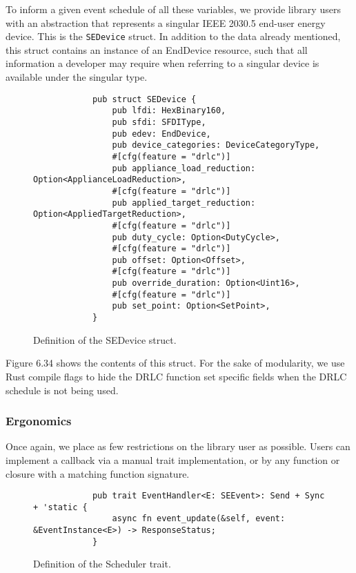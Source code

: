 To inform a given event schedule of all these variables, we provide library users with an abstraction that represents a singular IEEE 2030.5 end-user energy device. This is the \texttt{SEDevice} struct.
In addition to the data already mentioned, this struct contains an instance of an EndDevice resource, such that all information a developer may require when referring to a singular device is available under the singular type.

\begin{figure}[h]
    \begin{center}
        \begin{lstlisting}
            pub struct SEDevice {
                pub lfdi: HexBinary160,
                pub sfdi: SFDIType,
                pub edev: EndDevice,
                pub device_categories: DeviceCategoryType,
                #[cfg(feature = "drlc")]
                pub appliance_load_reduction: Option<ApplianceLoadReduction>,
                #[cfg(feature = "drlc")]
                pub applied_target_reduction: Option<AppliedTargetReduction>,
                #[cfg(feature = "drlc")]
                pub duty_cycle: Option<DutyCycle>,
                #[cfg(feature = "drlc")]
                pub offset: Option<Offset>,
                #[cfg(feature = "drlc")]
                pub override_duration: Option<Uint16>,
                #[cfg(feature = "drlc")]
                pub set_point: Option<SetPoint>,
            }
        \end{lstlisting}
        \label{fig:sedevicestruct}
        \vspace{-10pt}
        \caption{Definition of the SEDevice struct.}
    \end{center}
\end{figure}

Figure 6.34 shows the contents of this struct. For the sake of modularity, we use Rust compile flags to hide the DRLC function set specific fields when the DRLC schedule is not being used. 

\subsubsection{Ergonomics}
Once again, we place as few restrictions on the library user as possible. Users can implement a callback via a manual trait implementation, or by any function or closure with a matching function signature.

\begin{figure}[h]
    \begin{center}
        \begin{lstlisting}
            pub trait EventHandler<E: SEEvent>: Send + Sync + 'static {
                async fn event_update(&self, event: &EventInstance<E>) -> ResponseStatus;
            }
        \end{lstlisting}
        \label{fig:eventhandlertrait}
        \vspace{-10pt}
        \caption{Definition of the Scheduler trait.}
    \end{center}
\end{figure}

